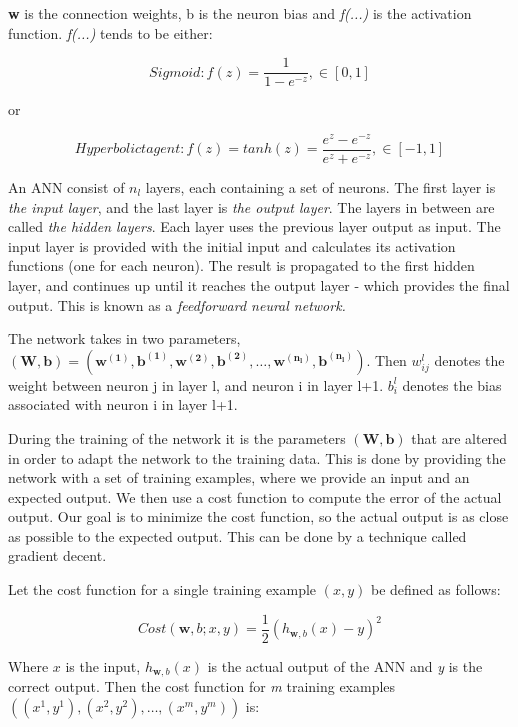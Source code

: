\textbf{w} is the connection weights, b is the neuron bias and \textit{f(...)} is the activation function. \textit{f(...)} tends to be either:

\begin{equation*}
Sigmoid: f(z) = \frac{1}{1 - e^{-z}}, \in [0,1]
\end{equation*}

or 

\begin{equation*}
Hyperbolic tagent: f(z) = tanh(z) = \frac{e^z - e^{-z}}{e^z + e^{-z}}, \in [-1,1]
\end{equation*}

An ANN consist of $ n_l $ layers, each containing a set of neurons. The first layer is \textit{the input layer}, and the last layer is \textit{the output layer}. The layers in between are called \textit{the hidden layers}. Each layer uses the previous layer output as input. The input layer is provided with the initial input and calculates its activation functions (one for each neuron). The result is propagated to the first hidden layer, and continues up until it reaches the output layer - which provides the final output. This is known as a \textit{feedforward neural network.}

The network takes in two parameters, $ (\mathbf{W, b}) = (\mathbf{w^{(1)}, b^{(1)}}, 
\mathbf{w^{(2)}, b^{(2)}}, \dots , 
\mathbf{w^{(n_l)}, b^{(n_l)}}) $. Then $ w_{ij}^l $ denotes the weight between neuron j in layer l, and neuron i in layer l+1. $ b_i^l $ denotes the bias associated with neuron i in layer l+1.

During the training of the network it is the parameters $ (\mathbf{W, b}) $ that are altered in order to adapt the network to the training data. This is done by providing the network with a set of training examples, where we provide an input and an expected output. We then use a cost function to compute the error of the actual output. Our goal is to minimize the cost function, so the actual output is as close as possible to the expected output. This can be done by a technique called gradient decent. 

Let the cost function for a single training example $(x,y)$ be defined as follows:

\begin{equation*}
	Cost(\mathbf{w},b; x, y) = \frac{1}{2}(h_{\mathbf{w},b}(x) - y)^2
\end{equation*}

Where $ x $ is the input, $ h_{\mathbf{w},b}(x) $ is the actual output of the ANN and \textit{y} is the correct output.
Then the cost function for \textit{m} training examples $ ((x^{1}, y^{1}), (x^{2}, y^{2}), \dots, (x^{m}, y^{m})) $ is:

